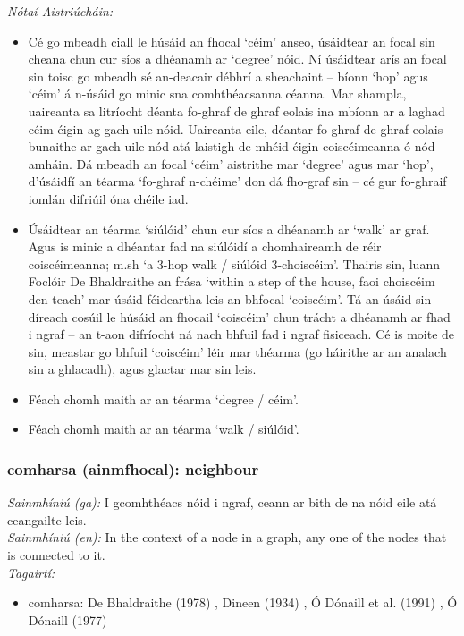 \documentclass{article}
\begin{document}
 \noindent \textit{Nótaí Aistriúcháin:}
\begin{itemize}
	\item Cé go mbeadh ciall le húsáid an fhocal `céim' anseo, úsáidtear an focal sin cheana chun cur síos a dhéanamh ar `degree' nóid. Ní úsáidtear arís an focal sin toisc go mbeadh sé an-deacair débhrí a sheachaint -- bíonn `hop' agus `céim' á n-úsáid go minic sna comhthéacsanna céanna. Mar shampla, uaireanta sa litríocht déanta fo-ghraf de ghraf eolais ina mbíonn ar a laghad céim éigin ag gach uile nóid. Uaireanta eile, déantar fo-ghraf de ghraf eolais bunaithe ar gach uile nód atá laistigh de mhéid éigin coiscéimeanna ó nód amháin. Dá mbeadh an focal `céim' aistrithe mar `degree' agus mar `hop', d'úsáidfí an téarma `fo-ghraf n-chéime' don dá fho-graf sin -- cé gur fo-ghraif iomlán difriúil óna chéile iad.
	\item Úsáidtear an téarma `siúlóid' chun cur síos a dhéanamh ar `walk' ar graf. Agus is minic a dhéantar fad na siúlóidí a chomhaireamh de réir coiscéimeanna; m.sh `a 3-hop walk / siúlóid 3-choiscéim'. Thairis sin, luann Foclóir De Bhaldraithe an frása `within a step of the house, faoi choiscéim den teach' mar úsáid féideartha leis an bhfocal `coiscéim'. Tá an úsáid sin díreach cosúil le húsáid an fhocail `coiscéim' chun trácht a dhéanamh ar fhad i ngraf -- an t-aon difríocht ná nach bhfuil fad i ngraf fisiceach. Cé is moite de sin, meastar go bhfuil `coiscéim' léir mar théarma (go háirithe ar an analach sin a ghlacadh), agus glactar mar sin leis.
	\item Féach chomh maith ar an téarma `degree / céim'.
	\item Féach chomh maith ar an téarma `walk / siúlóid'.
\end{itemize}


\subsubsection*{comharsa (ainmfhocal): neighbour}
 \noindent \textit{Sainmhíniú (ga):} I gcomhthéacs nóid i ngraf, ceann ar bith de na nóid eile atá ceangailte leis.
\\
 \noindent \textit{Sainmhíniú (en):} In the context of a node in a graph, any one of the nodes that is connected to it.
\\
 \noindent \textit{Tagairtí:}
\begin{itemize}
	\item comharsa: De Bhaldraithe (1978) \cite{de-bhaldraithe}, Dineen (1934) \cite{dineen}, Ó Dónaill et al. (1991) \cite{focloir-beag}, Ó Dónaill (1977) \cite{odonaill}
\end{itemize}
\end{document}
